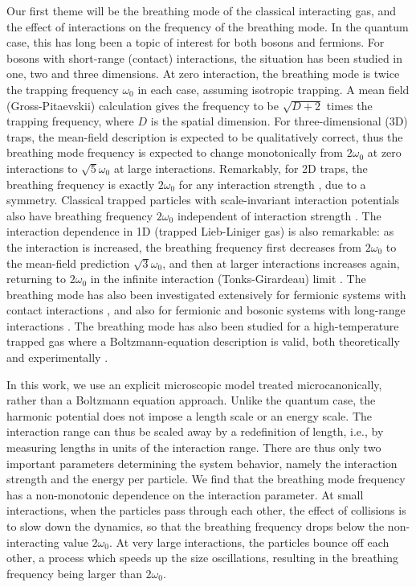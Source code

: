 \documentclass[a4paper, onecolumn]{revtex4-1}
\begin{document}
Our first theme will be the breathing mode of the classical interacting gas, and the effect of
interactions on the frequency of the breathing mode.  In the quantum case, this has long been a
topic of interest for both bosons and fermions.  For bosons with short-range (contact) interactions,
the situation has been studied in one, two and three dimensions.  At zero interaction, the breathing
mode is twice the trapping frequency $\omega_0$ in each case, assuming isotropic trapping.  A mean
field (Gross-Pitaevskii) calculation gives the frequency to be $\sqrt{D+2}$ times the trapping
frequency, where $D$ is the spatial dimension.  For three-dimensional (3D) traps, the mean-field
description is expected to be qualitatively correct, thus the breathing mode frequency is expected
to change monotonically from $2\omega_0$ at zero interactions to $\sqrt{5}\omega_0$ at large
interactions.  Remarkably, for 2D traps, the breathing frequency is exactly $2\omega_0$ for any
interaction strength \cite{PitaevskiiRosch_PRA97}, due to a symmetry.  Classical trapped particles
with scale-invariant interaction potentials also have breathing frequency $2\omega_0$ independent of
interaction strength \cite{PitaevskiiRosch_PRA97}.  The interaction dependence in 1D (trapped
Lieb-Liniger gas) is also remarkable: as the interaction is increased, the breathing frequency first
decreases from $2\omega_0$ to the mean-field prediction $\sqrt{3}\omega_0$, and then at larger
interactions increases again, returning to $2\omega_0$ in the infinite interaction (Tonks-Girardeau)
limit \cite{Naegerl_Science09, Tschischik_BHbreathing_PRA_2013, 1D_breathing_mode_recent,
  Bouchoule_PRL2014, KroenkeSchmelcher_BM}.
%
The breathing mode has also been investigated extensively for fermionic systems with contact
interactions \cite{GrimmSmith_unitaryfermions_PRA08, fermion2Dbreathing,
  Stringari_lowDcollective_PRA15}, and also for fermionic and bosonic systems with long-range
interactions \cite{OrignacCitro_PRA08, br_mode_long_range_interactions, Bonitz_Review}.  The
breathing mode has also been studied for a high-temperature trapped gas where a Boltzmann-equation
description is valid, both theoretically \cite{GueryOdelin1999, GueryOdelin_thermalization_PRA06}
and experimentally \cite{Cornell_classsical_3Dexpt_NatPhys15}.

In this work, we use an explicit microscopic model treated microcanonically, rather than a Boltzmann
equation approach.  Unlike the quantum case, the harmonic potential does not impose a length scale
or an energy scale.  The interaction range can thus be scaled away by a redefinition of length,
i.e., by measuring lengths in units of the interaction range.  There are thus only two important
parameters determining the system behavior, namely the interaction strength and the energy per
particle.  We find that the breathing mode frequency has a non-monotonic dependence on the
interaction parameter.  At small interactions, when the particles pass through each other, the
effect of collisions is to slow down the dynamics, so that the breathing frequency drops below the
non-interacting value $2\omega_0$.  At very large interactions, the particles bounce off each other,
a process which speeds up the size oscillations, resulting in the breathing frequency being larger
than $2\omega_0$.
\end{document}
